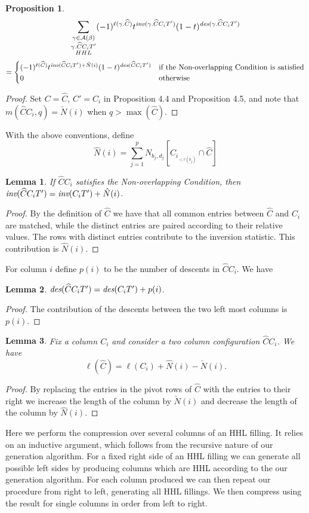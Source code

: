 \documentclass[11pt]{amsart}
\newtheorem{prop}{Proposition}[section]
\newtheorem{lemma}{Lemma}[section]
\begin{document}
{\begin{prop}
\[
\sum_{\substack{\gamma \in \mathcal{A}(\beta)\\ \gamma.\widehat{C}C_{i}T'\\ HHL}} (-1)^{\ell(\gamma.\widehat{C})}t^{\emph{inv}(\gamma.\widehat{C}C_{i}T')}(1-t)^{\emph{des}(\gamma.\widehat{C}C_{i}T')}
\]
\[
=\begin{cases}
(-1)^{\ell(\widehat{C})}t^{\emph{inv}(\widehat{C}C_{i}T')+\check{N}(i)}(1-t)^{\emph{des}(\widehat{C}C_{i}T')} & \text{if the Non-overlapping Condition is satisfied}\\
0 & \text{otherwise}
\end{cases}
\]
\end{prop}
\begin{proof}
Set $C=\widehat{C}$, $C'=C_{i}$ in Proposition 4.4 and Proposition 4.5, and note that $m(\widehat{C}C_{i},q)=\check{N}(i)$ when $q>\max(\widehat{C})$.
\end{proof}
With the above conventions, define 
\[
\hat{N}(i)=\sum_{j=1}^{p}N_{b_{j},d_{j}}[C_{i_{<r(b_{j})}}\cap \widehat{C}]
\]
\begin{lemma}
If $\widehat{C}C_{i}$ satisfies the Non-overlapping Condition, then $\emph{inv}(\widehat{C}C_{i}T')=\emph{inv}(C_{i}T')+\hat{N}(i)$.
\end{lemma}
\begin{proof}
By the definition of $\widehat{C}$ we have that all common entries between $\widehat{C}$ and $C_{i}$ are matched, while the distinct entries are paired according to their relative values. The rows with distinct entries contribute to the inversion statistic. This contribution is $\hat{N}(i)$.
\end{proof}
For column $i$ define $p(i)$ to be the number of descents in $\widehat{C}C_{i}$. We have 
\begin{lemma}
$\emph{des}(\widehat{C}C_{i}T')=\emph{des}(C_{i}T')+p(i)$.
\end{lemma}
\begin{proof}
The contribution of the descents between the two left most columns is $p(i)$. 
\end{proof}
\begin{lemma}
Fix a column $C_{i}$ and consider a two column configuration $\widehat{C}C_{i}$. We have 
\[
\ell(\widehat{C})=\ell(C_{i})+\hat{N}(i)-\check{N}(i).
\]
\end{lemma}
\begin{proof}
By replacing the entries in the pivot rows of $\widehat{C}$ with the entries to their right we increase the length of the column by $\check{N}(i)$ and decrease the length of the column by $\hat{N}(i)$. 
\end{proof}
\indent Here we perform the compression over several columns of an HHL filling. It relies on an inductive argument, which follows from the recursive nature of our generation algorithm. For a fixed right side of an HHL filling we can generate all possible left sides by producing columns which are HHL according to the our generation algorithm. For each column produced we can then repeat our procedure from right to left, generating all HHL fillings. We then compress using the result for single columns in order from left to right.  
 
}
\end{document}
